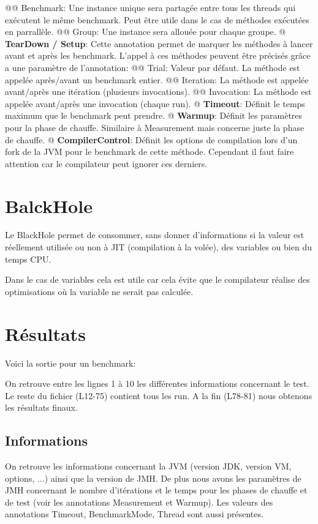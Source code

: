 \documentclass{report}
\begin{document}
\begin{easylist}[itemize]
				@@ Benchmark: Une instance unique sera partagée entre tous les threads qui exécutent le même benchmark. 
				Peut être utile dans le cas de méthodes exécutées en parrallèle.
				@@ Group: Une instance sera allouée pour chaque groupe.
				@ \textbf{TearDown / Setup}: Cette annotation permet de marquer les méthodes à lancer avant et après les benchmark.
				L'appel à ces méthodes peuvent être précisés grâce a une paramètre de l'annotation:
				@@ Trial: Valeur par défaut. La méthode est appelée après/avant un benchmark entier.
				@@ Iteration: La méthode est appelée avant/après une itération (plusieurs invocations).
				@@ Invocation: La méthode est appelée avant/après une invocation (chaque run).
				@ \textbf{Timeout}: Définit le temps maximum que le benchmark peut prendre.
				@ \textbf{Warmup}: Définit les paramètres pour la phase de chauffe.
				Similaire à Measurement mais concerne juste la phase de chauffe.
				@ \textbf{CompilerControl}: Définit les options de compilation lors d'un fork de la JVM pour le benchmark de cette méthode.
				Cependant il faut faire attention car le compilateur peut ignorer ces derniers.
			\end{easylist}
		
		\section{BalckHole}
			Le BlackHole permet de consommer, sans donner d'informations si la valeur est réellement utilisée ou non à JIT (compilation à la volée), des variables ou bien du temps CPU.
			
			Dans le cas de variables cela est utile car cela évite que le compilateur réalise des optimisations où la variable ne serait pas calculée.
			
		\section{Résultats}
			Voici la sortie pour un benchmark:
			
			
			On retrouve entre les lignes 1 à 10 les différentes informations concernant le test.
			Le reste du fichier (L12-75) contient tous les run.
			A la fin (L78-81) nous obtenons les résultats finaux.
			
			\subsection{Informations}
				On retrouve les informations concernant la JVM (version JDK, version VM, options, ...) ainsi que la version de JMH.
				De plus nous avons les paramètres de JMH concernant le nombre d'itérations et le temps pour les phases de chauffe et de test (voir les annotations Measurement et Warmup).
				Les valeurs des annotations Timeout, BenchmarkMode, Thread sont aussi présentes.
			
\end{document}
